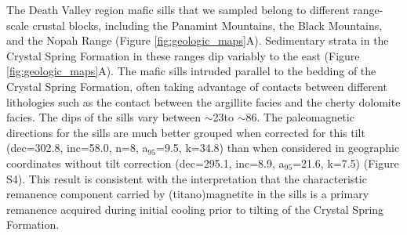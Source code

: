 The Death Valley region mafic sills that we sampled belong to different range-scale crustal blocks, including the Panamint Mountains, the Black Mountains, and the Nopah Range (Figure \ref{fig:geologic_maps}A). Sedimentary strata in the Crystal Spring Formation in these ranges dip variably to the east (Figure \ref{fig:geologic_maps}A). The mafic sills intruded parallel to the bedding of the Crystal Spring Formation, often taking advantage of contacts between different lithologies such as the contact between the argillite facies and the cherty dolomite facies. The dips of the sills vary between $\sim$23\textdegree to $\sim$86\textdegree. The paleomagnetic directions for the sills are much better grouped when corrected for this tilt (dec=302.8\textdegree, inc=58.0\textdegree, n=8, a$_{95}$=9.5\textdegree, k=34.8) than when considered in geographic coordinates without tilt correction (dec=295.1\textdegree, inc=8.9\textdegree, a$_{95}$=21.6\textdegree, k=7.5) (Figure S4). This result is consistent with the interpretation that the characteristic remanence component carried by (titano)magnetite in the sills is a primary remanence acquired during initial cooling prior to tilting of the Crystal Spring Formation. 

